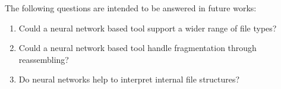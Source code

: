 The following questions are intended to be answered in future works: 

\begin{enumerate}[itemindent=\parindent,label=\textbf{Q\arabic*.}]

    \item Could a neural network based tool support a wider range of file types?
    
    \item Could a neural network based tool handle fragmentation through reassembling?
    

\item Do neural networks help to interpret internal file structures?

\end{enumerate}
